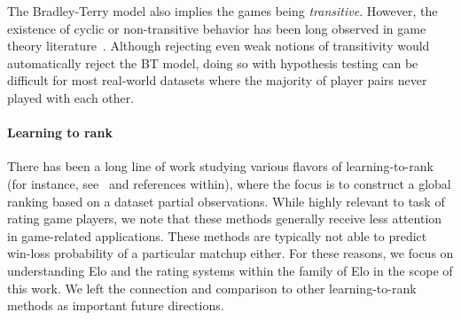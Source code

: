 
The Bradley-Terry model also implies the games being \emph{transitive}. However, the existence of cyclic or non-transitive behavior has been long observed in game theory literature~\citep{samothrakis2012coevolving,chen2016modeling,omidshafiei2019alpha,czarnecki2020real}. Although rejecting even weak notions of transitivity would automatically reject the BT model, doing so with hypothesis testing can be difficult for most real-world datasets where the majority of player pairs never played with each other.

\paragraph{Learning to rank}
There has been a long line of work studying various flavors of learning-to-rank (for instance, see~\citet{liu2009learning, negahban2012iterative, braverman2009sorting, shah2018simple} and references within), where the focus is to construct a global ranking based on a dataset partial observations. 
While highly relevant to task of rating game players, we note that these methods generally receive less attention in game-related applications. These methods are typically not able to predict win-loss probability of a particular matchup either.
For these reasons, we focus on understanding Elo and the rating systems within the family of Elo in the scope of this work. We left the connection and comparison to other learning-to-rank methods as important future directions.